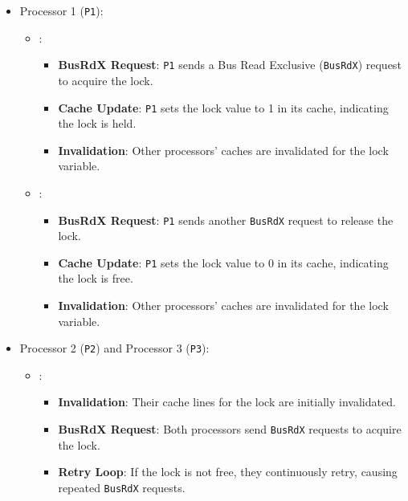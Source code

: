 \begin{itemize}
    \item Processor 1 (\texttt{P1}):
    \begin{itemize}
        \item {}:
        \begin{itemize}
            \item \textbf{BusRdX Request}: \texttt{P1} sends a Bus Read Exclusive (\texttt{BusRdX}) request to acquire the lock.
            \item \textbf{Cache Update}: \texttt{P1} sets the lock value to 1 in its cache, indicating the lock is held.
            \item \textbf{Invalidation}: Other processors' caches are invalidated for the lock variable.
        \end{itemize}

        \item {}:
        \begin{itemize}
            \item \textbf{BusRdX Request}: \texttt{P1} sends another \texttt{BusRdX} request to release the lock.
            \item \textbf{Cache Update}: \texttt{P1} sets the lock value to 0 in its cache, indicating the lock is free.
            \item \textbf{Invalidation}: Other processors' caches are invalidated for the lock variable.
        \end{itemize}
    \end{itemize}

    \newpage
    
    \item Processor 2 (\texttt{P2}) and Processor 3 (\texttt{P3}):
    \begin{itemize}
        \item {}:
        \begin{itemize}
            \item \textbf{Invalidation}: Their cache lines for the lock are initially invalidated.
            \item \textbf{BusRdX Request}: Both processors send \texttt{BusRdX} requests to acquire the lock.
            \item \textbf{Retry Loop}: If the lock is not free, they continuously retry, causing repeated \texttt{BusRdX} requests.
        \end{itemize}
    \end{itemize}
\end{itemize}

